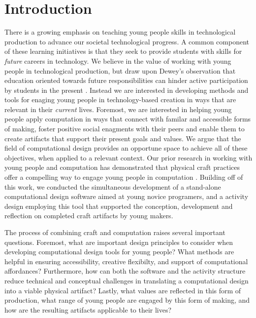 \documentclass{sigchi}
\begin{document}
\section{Introduction}
There is a growing emphasis on teaching young people skills in technological production to advance our societal technological progress. A common component of these learning initiatives is that they seek to provide students with skills for \textit{future} careers in technology.
We believe in the value of working with young people in technological production, but draw upon Dewey's observation that education oriented towards future responsibilities can hinder active participation by students in the present \cite{dewey}. Instead we are interested in developing methods and tools for enaging young people in technology-based creation in ways that are relevant in their \emph{current} lives. Foremost, we are interested in helping young people apply computation in ways that connect with familar and accessible forms of making, foster positive social enagments with their peers and enable them to create artifacts that support their present goals and values. We argue that the field of computational design provides an opportune space to achieve all of these objectives, when applied to a relevant context. Our prior research in working with young people and computation has demonstrated that physical craft practices offer a compelling way to engage young people in computation \cite{jacobsj}.  Building off of this work, we conducted the simultaneous development of a stand-alone computational design software aimed at young novice programers, and a activity design employing this tool that supported the conception, development and reflection on completed craft artifacts by young makers.

The process of combining craft and computation raises several important questions. Foremost, what are important design principles to consider when developing computational design tools for young people? What methods are helpful in ensuring accessibility, creative flexibilty, and support of computational affordances? Furthermore, how can both the software and the activity structure reduce technical and conceptual challenges in translating a computational design into a viable physical artifact? Lastly, what values are reflected in this form of production, what range of young people are engaged by this form of making, and how are the resulting artifacts applicable to their lives?
\end{document}
